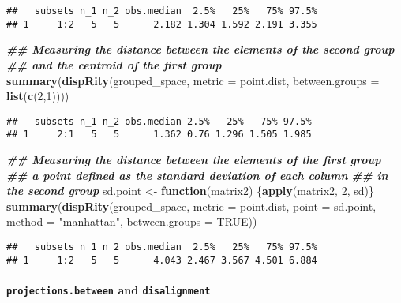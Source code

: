 \documentclass[
]{book}
\newenvironment{Shaded}{\begin{snugshade}}{\end{snugshade}}
\newcommand{\AttributeTok}[1]{\textcolor[rgb]{0.13,0.29,0.53}{#1}}
\newcommand{\ConstantTok}[1]{\textcolor[rgb]{0.56,0.35,0.01}{#1}}
\newcommand{\ControlFlowTok}[1]{\textcolor[rgb]{0.13,0.29,0.53}{\textbf{#1}}}
\newcommand{\DecValTok}[1]{\textcolor[rgb]{0.00,0.00,0.81}{#1}}
\newcommand{\DocumentationTok}[1]{\textcolor[rgb]{0.56,0.35,0.01}{\textbf{\textit{#1}}}}
\newcommand{\FunctionTok}[1]{\textcolor[rgb]{0.13,0.29,0.53}{\textbf{#1}}}
\newcommand{\NormalTok}[1]{#1}
\newcommand{\OtherTok}[1]{\textcolor[rgb]{0.56,0.35,0.01}{#1}}
\newcommand{\StringTok}[1]{\textcolor[rgb]{0.31,0.60,0.02}{#1}}
\begin{document}
\begin{verbatim}
##   subsets n_1 n_2 obs.median  2.5%   25%   75% 97.5%
## 1     1:2   5   5      2.182 1.304 1.592 2.191 3.355
\end{verbatim}

\begin{Shaded}
\begin{Highlighting}[]
\DocumentationTok{\#\# Measuring the distance between the elements of the second group}
\DocumentationTok{\#\# and the centroid of the first group}
\FunctionTok{summary}\NormalTok{(}\FunctionTok{dispRity}\NormalTok{(grouped\_space, }\AttributeTok{metric =}\NormalTok{ point.dist,}
                 \AttributeTok{between.groups =} \FunctionTok{list}\NormalTok{(}\FunctionTok{c}\NormalTok{(}\DecValTok{2}\NormalTok{,}\DecValTok{1}\NormalTok{))))}
\end{Highlighting}
\end{Shaded}

\begin{verbatim}
##   subsets n_1 n_2 obs.median 2.5%   25%   75% 97.5%
## 1     2:1   5   5      1.362 0.76 1.296 1.505 1.985
\end{verbatim}

\begin{Shaded}
\begin{Highlighting}[]
\DocumentationTok{\#\# Measuring the distance between the elements of the first group}
\DocumentationTok{\#\# a point defined as the standard deviation of each column}
\DocumentationTok{\#\# in the second group}
\NormalTok{sd.point }\OtherTok{\textless{}{-}} \ControlFlowTok{function}\NormalTok{(matrix2) \{}\FunctionTok{apply}\NormalTok{(matrix2, }\DecValTok{2}\NormalTok{, sd)\}}
\FunctionTok{summary}\NormalTok{(}\FunctionTok{dispRity}\NormalTok{(grouped\_space, }\AttributeTok{metric =}\NormalTok{ point.dist,}
                 \AttributeTok{point =}\NormalTok{ sd.point, }\AttributeTok{method =} \StringTok{"manhattan"}\NormalTok{,}
                 \AttributeTok{between.groups =} \ConstantTok{TRUE}\NormalTok{))}
\end{Highlighting}
\end{Shaded}

\begin{verbatim}
##   subsets n_1 n_2 obs.median  2.5%   25%   75% 97.5%
## 1     1:2   5   5      4.043 2.467 3.567 4.501 6.884
\end{verbatim}

\hypertarget{projections.between-and-disalignment}{%
\paragraph{\texorpdfstring{\texttt{projections.between} and \texttt{disalignment}}{projections.between and disalignment}}\label{projections.between-and-disalignment}}
\end{document}
